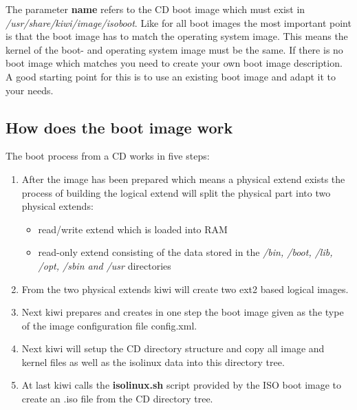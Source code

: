 The parameter \textbf{name} refers to the CD boot image which
must exist in \textit{/usr/share/kiwi/image/isoboot}. Like for all boot
images the most important point is that the boot image has to
match the operating system image. This means the kernel of the boot-
and operating system image must be the same. If there is no
boot image which matches you need to create your own boot image
description. A good starting point for this is to use an existing
boot image and adapt it to your needs.

\subsection{How does the boot image work}
The boot process from a CD works in five steps:

\begin{enumerate}
\item After the image has been prepared which means a physical extend
      exists the process of building the logical extend will split
      the physical part into two physical extends:
      \begin{itemize}
      \item read/write extend which is loaded into RAM
      \item read-only extend consisting of the data stored
            in the \textit{/bin, /boot, /lib, /opt, /sbin and /usr}
            directories
      \end{itemize}
\item From the two physical extends kiwi will create two ext2
      based logical images.
\item Next kiwi prepares and creates in one step the boot image given 
      as the type of the image configuration file config.xml.
\item Next kiwi will setup the CD directory structure and copy all
      image and kernel files as well as the isolinux data into this
      directory tree.
\item At last kiwi calls the \textbf{isolinux.sh} script provided
      by the ISO boot image to create an .iso file from the CD
      directory tree.
\end{enumerate}
